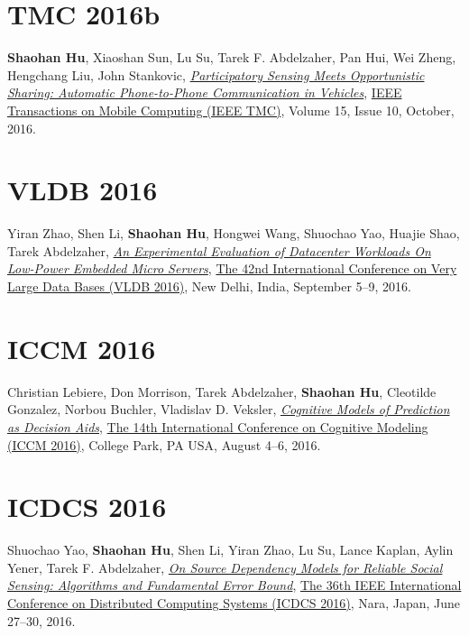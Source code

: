 \section{\sc TMC 2016b}\hypertarget{hu2015tmc}{}
\textbf{Shaohan Hu}, Xiaoshan Sun, Lu Su, Tarek F. Abdelzaher, Pan Hui, Wei Zheng, Hengchang Liu, John Stankovic,
\href{http://ieeexplore.ieee.org/xpls/abs_all.jsp?arnumber=7337442}{\emph{Participatory Sensing Meets Opportunistic Sharing: Automatic Phone-to-Phone Communication in Vehicles}},
\href{http://www.computer.org/web/tmc}{\textsf{IEEE Transactions on Mobile Computing (IEEE TMC)}},
Volume 15, Issue 10, October, 2016.

\section{\sc VLDB 2016}\hypertarget{zhao2016vldb}{}
Yiran Zhao, Shen Li, \textbf{Shaohan Hu}, Hongwei Wang, Shuochao Yao, Huajie Shao, Tarek Abdelzaher,
\href{http://dl.acm.org/citation.cfm?id=2947625}{\emph{An Experimental Evaluation of Datacenter Workloads On Low-Power Embedded Micro Servers}},
\href{http://vldb2016.persistent.com/}{\textsf{The 42nd International Conference on Very Large Data Bases (VLDB 2016)}},
New Delhi, India, September 5--9, 2016.

\section{\sc ICCM 2016}\hypertarget{Lebiere2016iccm}{}
Christian Lebiere, Don Morrison, Tarek Abdelzaher, \textbf{Shaohan Hu}, Cleotilde Gonzalez, Norbou Buchler, Vladislav D. Veksler,
\href{http://acs.ist.psu.edu/iccm2016/proceedings/lebiere2016iccm.pdf}{\emph{Cognitive Models of Prediction as Decision Aids}},
\href{http://acs.ist.psu.edu/iccm2016/}{\textsf{The 14th International Conference on Cognitive Modeling (ICCM 2016)}},
College Park, PA USA, August 4--6, 2016.

\section{\sc ICDCS 2016}\hypertarget{yao2016icdcs}{}
Shuochao Yao, \textbf{Shaohan Hu}, Shen Li, Yiran Zhao, Lu Su, Lance Kaplan, Aylin Yener, Tarek F. Abdelzaher,
\href{http://ieeexplore.ieee.org/stamp/stamp.jsp?tp=&arnumber=7536545}{\emph{On Source Dependency Models for Reliable Social Sensing: Algorithms and Fundamental Error Bound}},
\href{http://www-higashi.ist.osaka-u.ac.jp/icdcs2016/}{\textsf{The 36th IEEE International Conference on Distributed Computing Systems (ICDCS 2016)}},
Nara, Japan, June 27--30, 2016.

